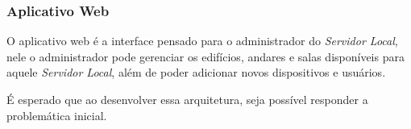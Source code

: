 \subsubsection{Aplicativo Web}
O aplicativo web é a interface pensado para o administrador do \emph{Servidor Local}, nele o administrador pode
gerenciar os edifícios, andares e salas disponíveis para aquele \emph{Servidor Local}, além de poder adicionar 
novos dispositivos e usuários.

É esperado que ao desenvolver essa arquitetura, seja possível responder a problemática inicial.